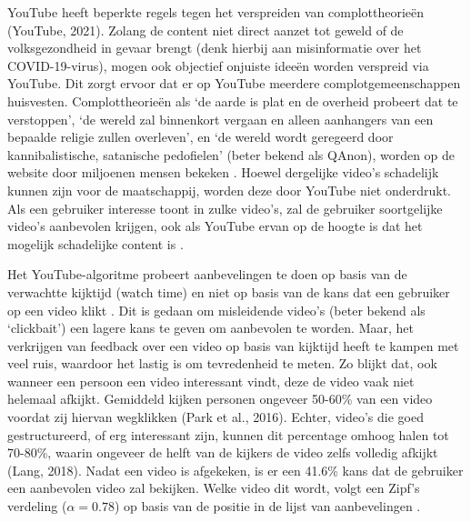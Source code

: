 \documentclass{uva-inf-article}
\begin{document}
YouTube heeft beperkte regels tegen het verspreiden van complottheorieën (YouTube, 2021). Zolang de content niet direct aanzet tot geweld of de volksgezondheid in gevaar brengt (denk hierbij aan misinformatie over het COVID-19-virus), mogen ook objectief onjuiste ideeën worden verspreid via YouTube. Dit zorgt ervoor dat er op YouTube meerdere complotgemeenschappen huisvesten. Complottheorieën als ‘de aarde is plat en de overheid probeert dat te verstoppen’, ‘de wereld zal binnenkort vergaan en alleen aanhangers van een bepaalde religie zullen overleven’, en ‘de wereld wordt geregeerd door kannibalistische, satanische pedofielen’ (beter bekend als QAnon), worden op de website door miljoenen mensen bekeken \citep{paolillo2018flat, miller2021characterizing}. Hoewel dergelijke video’s schadelijk kunnen zijn voor de maatschappij, worden deze door YouTube niet onderdrukt. Als een gebruiker interesse toont in zulke video’s, zal de gebruiker soortgelijke video’s aanbevolen krijgen, ook als YouTube ervan op de hoogte is dat het mogelijk schadelijke content is \citep{ledwich2019algorithmic}.

Het YouTube-algoritme probeert aanbevelingen te doen op basis van de verwachtte kijktijd (watch time) en niet op basis van de kans dat een gebruiker op een video klikt \citep{covington2016deep}. Dit is gedaan om misleidende video’s (beter bekend als ‘clickbait’) een lagere kans te geven om aanbevolen te worden. Maar, het verkrijgen van feedback over een video op basis van kijktijd heeft te kampen met veel ruis, waardoor het lastig is om tevredenheid te meten. Zo blijkt dat, ook wanneer een persoon een video interessant vindt, deze de video vaak niet helemaal afkijkt. Gemiddeld kijken personen ongeveer 50-60\% van een video voordat zij hiervan wegklikken (Park et al., 2016). Echter, video’s die goed gestructureerd, of erg interessant zijn, kunnen dit percentage omhoog halen tot 70-80\%, waarin ongeveer de helft van de kijkers de video zelfs volledig afkijkt (Lang, 2018). Nadat een video is afgekeken, is er een 41.6\% kans dat de gebruiker een aanbevolen video zal bekijken. Welke video dit wordt, volgt een Zipf’s verdeling ($\alpha = 0.78$) op basis van de positie in de lijst van aanbevelingen \citep{zhou2010impact}. 
\end{document}
